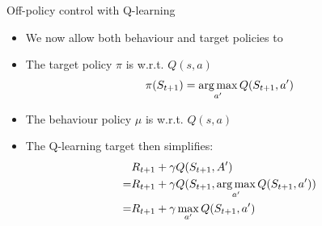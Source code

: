 \bgroup
\begin{frame}{Off-policy control with Q-learning}
\begin{itemize}
\item We now allow both behaviour and target policies to 
\item The target policy $\pi$ is  w.r.t. $Q(s, a)$
\begin{equation*}
\pi(S_{t+1}) = \operatorname*{arg\,max}_{a^{\prime}}Q(S_{t+1}, a^{\prime})
\end{equation*}
\item The behaviour policy $\mu$ is  w.r.t. $Q(s, a)$
\item The Q-learning target then simplifies:
\begin{align*}
& R_{t+1} + \gamma Q(S_{t+1}, A^{\prime})\\
=& R_{t+1} + \gamma Q(S_{t+1}, \operatorname*{arg\,max}_{a^{\prime}} Q(S_{t+1}, a^{\prime}))\\
=& R_{t+1} + \gamma \max_{a^{\prime}}Q(S_{t+1},a^{\prime})
\end{align*}
\end{itemize}
\end{frame}
\egroup